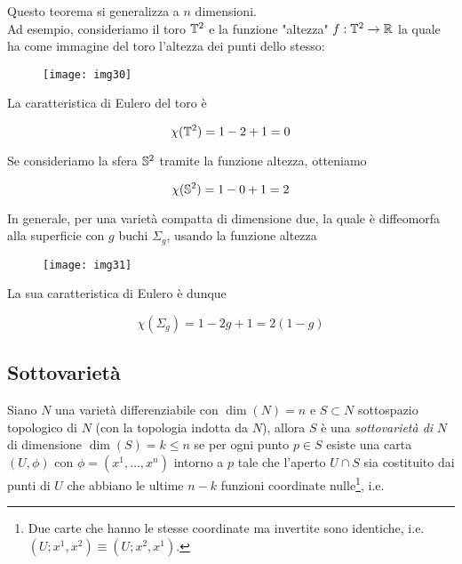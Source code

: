 Questo teorema si generalizza a $ n $ dimensioni.\\
Ad esempio, consideriamo il toro $ \T^{2} $ e la funzione "altezza" $ f : \T^{2} \to \R $ la quale ha come immagine del toro l'altezza dei punti dello stesso:

\begin{figure}[H]
	\centering
	\texttt{[image: img30]}
\end{figure}

La caratteristica di Eulero del toro è

\begin{equation}
	\chi(\T^{2}) = 1-2+1 = 0
\end{equation}

Se consideriamo la sfera $ \S^{2} $ tramite la funzione altezza, otteniamo

\begin{equation}
	\chi(\S^{2}) = 1-0+1 = 2
\end{equation}

In generale, per una varietà compatta di dimensione due, la quale è diffeomorfa alla superficie con $ g $ buchi $ \Sigma_{g} $, usando la funzione altezza

\begin{figure}[H]
	\centering
	\texttt{[image: img31]}
\end{figure}

La sua caratteristica di Eulero è dunque

\begin{equation}
	\chi(\Sigma_{g}) = 1-2g+1 = 2 (1-g)
\end{equation}

\subsection{Sottovarietà}

Siano $ N $ una varietà differenziabile con $ \dim(N)=n $ e $ S \subset N $ sottospazio topologico di $ N $ (con la topologia indotta da $ N $), allora $ S $ è una \textit{sottovarietà di} $ N $ di dimensione $ \dim(S) = k \leqslant n $ se per ogni punto $ p \in S $ esiste una carta $ (U,\phi) $ con $ \phi = (x^{1},\dots,x^{n}) $ intorno a $ p $ tale che l'aperto $ U \cap S $ sia costituito dai punti di $ U $ che abbiano le ultime $ n-k $ funzioni coordinate nulle\footnote{%
	Due carte che hanno le stesse coordinate ma invertite sono identiche, i.e. $ (U;x^{1},x^{2}) \equiv (U;x^{2},x^{1}) $.%
}, i.e.


